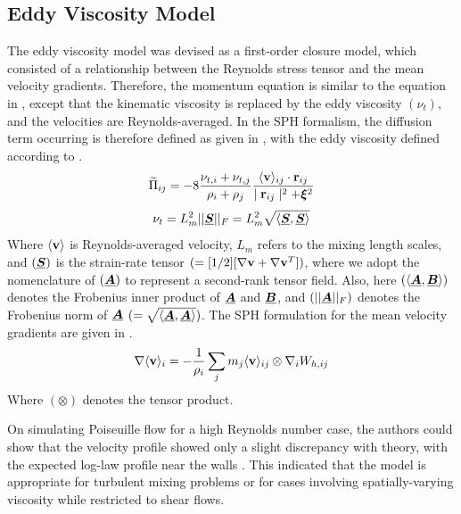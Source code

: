 \subsection{Eddy Viscosity Model}
\label{sec:eddy-visc-model}
The eddy viscosity model was devised as a first-order closure model, which consisted of a relationship between the Reynolds stress tensor and the mean velocity gradients. Therefore, the momentum equation is similar to the equation in , except that the kinematic viscosity is replaced by the eddy viscosity $(\nu_t)$, and the velocities are Reynolds-averaged. In the SPH formalism, the diffusion term occurring is therefore defined as given in , with the eddy viscosity defined according to .
\begin{equation}
    \widetilde{\Pi}_{ij} = -8 \frac{\nu_{t, i} + \nu_{t, j}}{\rho_i + \rho_j} \frac{\langle \mathbf{v} \rangle_{ij} \cdot \mathbf{r}_{ij} }{\mid \mathbf{r}_{ij} \mid^{2} + \bm{\xi}^2}
    \label{eq:violeau-turbulent-diffusion-term}
\end{equation}
\begin{equation}
    \nu_t = L_m^2 ||\underline{\bm{S}}||_F = L_m^2 \sqrt{\langle \underline{\bm{S}}, \underline{\bm{S}} \rangle}
    \label{eq:violeau-eddy-viscosity}
\end{equation}
Where $\langle \mathbf{v} \rangle$ is Reynolds-averaged velocity, $L_m$ refers to the mixing length scales, and $(\underline{\bm{S}})$ is the strain-rate tensor $(=[1/2][\nabla \mathbf{v} + \nabla \mathbf{v}^T])$, where we adopt the nomenclature of $(\underline{\bm{A}})$ to represent a second-rank tensor field. Also, here $(\langle \underline{\bm{A}}, \underline{\bm{B}} \rangle)$ denotes the Frobenius inner product of $\underline{\bm{A}}$ and $\underline{\bm{B}}$, and $(||\underline{\bm{A}}||_F)$ denotes the Frobenius norm of $\underline{\bm{A}}$ $( = \sqrt{\langle \underline{\bm{A}}, \underline{\bm{A}} \rangle})$.
The SPH formulation for the mean velocity gradients are given in .
\begin{equation}
    \nabla \langle \mathbf{v} \rangle_i = - \frac{1}{\rho_i} \sum_j m_j \langle \mathbf{v} \rangle_{ij} \otimes \nabla_{i} W_{h, ij}
    \label{eq:violeau-mean-velocity-gradient}
\end{equation}
Where $(\otimes)$ denotes the tensor product.

On simulating Poiseuille flow for a high Reynolds number case, the authors could show that the velocity profile showed only a slight discrepancy with theory, with the expected log-law profile near the walls . This indicated that the model is appropriate for turbulent mixing problems or for cases involving spatially-varying viscosity while restricted to shear flows.

